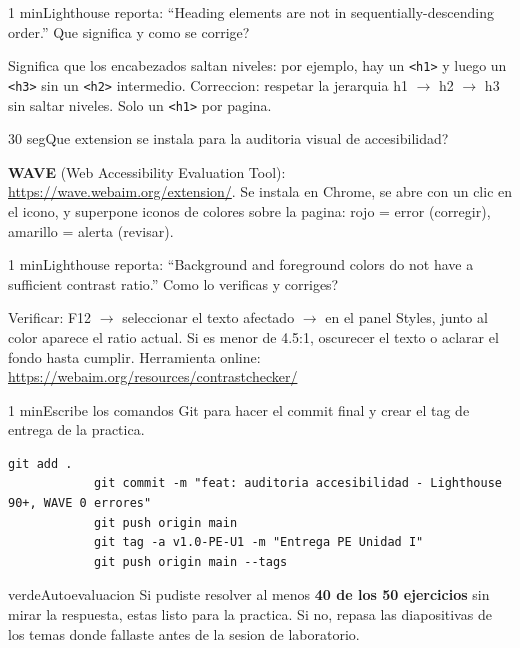 \documentclass[11pt,a4paper]{article}
\newcounter{nej}
\newcommand{\ej}[2]{%
	\stepcounter{nej}%
	\begin{ejercicio}{\arabic{nej}}{#1}#2\end{ejercicio}\vspace{4pt}}
\begin{document}
	\ej{1 min}{Lighthouse reporta: ``Heading elements are not in sequentially-descending order.'' Que significa y como se corrige?}
	
	\begin{respuesta}
		Significa que los encabezados saltan niveles: por ejemplo, hay un \texttt{<h1>} y luego un \texttt{<h3>} sin un \texttt{<h2>} intermedio. Correccion: respetar la jerarquia h1 $\to$ h2 $\to$ h3 sin saltar niveles. Solo un \texttt{<h1>} por pagina.
	\end{respuesta}
	\vspace{6pt}
	
	\ej{30 seg}{Que extension se instala para la auditoria visual de accesibilidad?}
	
	\begin{respuesta}
		\textbf{WAVE} (Web Accessibility Evaluation Tool): \url{https://wave.webaim.org/extension/}. Se instala en Chrome, se abre con un clic en el icono, y superpone iconos de colores sobre la pagina: rojo = error (corregir), amarillo = alerta (revisar).
	\end{respuesta}
	\vspace{6pt}
	
	\ej{1 min}{Lighthouse reporta: ``Background and foreground colors do not have a sufficient contrast ratio.'' Como lo verificas y corriges?}
	
	\begin{respuesta}
		Verificar: F12 $\to$ seleccionar el texto afectado $\to$ en el panel Styles, junto al color aparece el ratio actual. Si es menor de 4.5:1, oscurecer el texto o aclarar el fondo hasta cumplir. Herramienta online: \url{https://webaim.org/resources/contrastchecker/}
	\end{respuesta}
	\vspace{6pt}
	
	\ej{1 min}{Escribe los comandos Git para hacer el commit final y crear el tag de entrega de la practica.}
	
	\begin{respuesta}
		\begin{lstlisting}[style=codebash]
			git add .
			git commit -m "feat: auditoria accesibilidad - Lighthouse 90+, WAVE 0 errores"
			git push origin main
			git tag -a v1.0-PE-U1 -m "Entrega PE Unidad I"
			git push origin main --tags
		\end{lstlisting}
	\end{respuesta}
	\vspace{6pt}
	
	\vspace{0.5cm}
	
	\begin{cajatip}{verde}{Autoevaluacion}
		Si pudiste resolver al menos \textbf{40 de los 50 ejercicios} sin mirar la respuesta, estas listo para la practica. Si no, repasa las diapositivas de los temas donde fallaste antes de la sesion de laboratorio.
	\end{cajatip}
	
\end{document}
